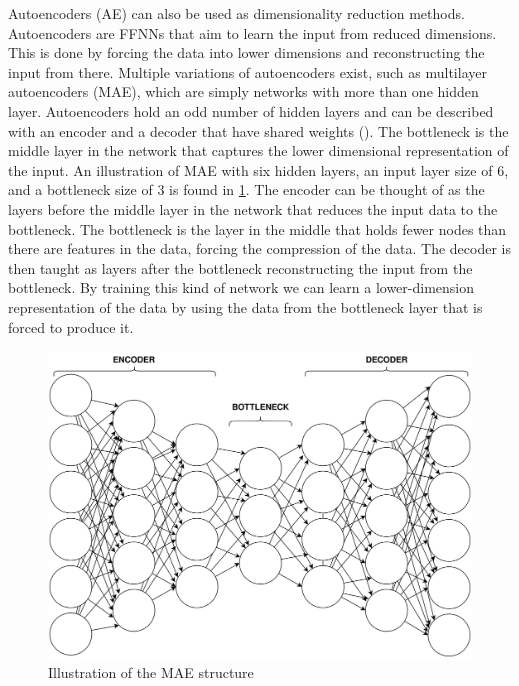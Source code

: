 Autoencoders (AE) can also be used as dimensionality reduction methods. Autoencoders are FFNNs that aim to learn the input from reduced dimensions. This is done by forcing the data into lower dimensions and reconstructing the input from there. Multiple variations of autoencoders exist, such as multilayer autoencoders (MAE), which are simply networks with more than one hidden layer. Autoencoders hold an odd number of hidden layers and can be described with an encoder and a decoder that have shared weights (\cite{van2009dimensionality}). The bottleneck is the middle layer in the network that captures the lower dimensional representation of the input. An illustration of MAE with six hidden layers, an input layer size of \(6\), and a bottleneck size of \(3\) is found in \ref{MAE}. The encoder can be thought of as the layers before the middle layer in the network that reduces the input data to the bottleneck. The bottleneck is the layer in the middle that holds fewer nodes than there are features in the data, forcing the compression of the data. The decoder is then taught as layers after the bottleneck reconstructing the input from the bottleneck. By training this kind of network we can learn a lower-dimension representation of the data by using the data from the bottleneck layer that is forced to produce it.

\begin{figure}
    \centering
    \includegraphics[width=0.75\linewidth]{template//figures/MAE.png}
    \caption{Illustration of the MAE structure}
    \label{MAE}
\end{figure}